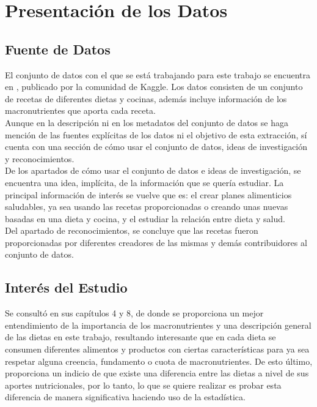 \documentclass[12pt,a4paper]{article}
\begin{document}
\newpage

\tableofcontents

\newpage

\section{Presentación de los Datos}

    \subsection{Fuente de Datos}
    El conjunto de datos con el que se está trabajando para este trabajo 
    se encuentra en \cite{dataset_macronutrients}, publicado por la comunidad 
    de Kaggle. Los datos consisten de un conjunto de recetas de diferentes 
    dietas y cocinas, además incluye información de los macronutrientes que 
    aporta cada receta.\\
    \cite{dataset_macronutrients} Aunque en la descripción ni en los metadatos del conjunto de datos se 
    haga mención de las fuentes explícitas de los datos ni el objetivo de 
    esta extracción, sí cuenta con una sección de cómo usar el conjunto de 
    datos, ideas de investigación y reconocimientos.\\
    De los apartados de cómo usar el conjunto de datos e ideas de investigación, 
    se encuentra una idea, implícita, de la información que se quería estudiar. 
    La principal información de interés se vuelve que es: el crear planes 
    alimenticios saludables, ya sea usando las recetas proporcionadas o creando 
    unas nuevas basadas en una dieta y cocina, y el estudiar la relación entre 
    dieta y salud.\\
    Del apartado de reconocimientos, se concluye que las recetas fueron 
    proporcionadas por diferentes creadores de las mismas y demás contribuidores 
    al conjunto de datos. 

    \subsection{Interés del Estudio}
    Se consultó \cite{marvastipopular} en sus 
    capítulos 4 y 8, de donde se proporciona un mejor entendimiento de la 
    importancia de los macronutrientes y una descripción general de las 
    dietas en este trabajo, resultando interesante que en cada dieta se 
    consumen diferentes alimentos y productos con ciertas características 
    para ya sea respetar alguna creencia, fundamento o cuota de macronutrientes. 
    De esto último, proporciona un indicio de que existe una diferencia entre 
    las dietas a nivel de sus aportes nutricionales, por lo tanto, lo que se 
    quiere realizar es probar esta diferencia de manera significativa haciendo 
    uso de la estadística.
\end{document}
